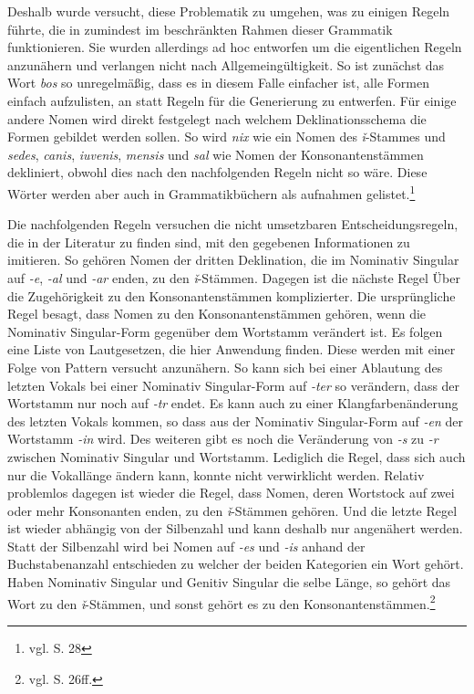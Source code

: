 \documentclass[fontsize=12pt,abstract=on,titlepage,bibliography=totoc,ngerman,listof=totoc]{scrreprt}
\begin{document}
Deshalb wurde versucht, diese Problematik zu umgehen, was zu einigen Regeln führte, die in zumindest im beschränkten Rahmen dieser Grammatik funktionieren. Sie wurden allerdings ad hoc entworfen um die eigentlichen Regeln anzunähern und verlangen nicht nach Allgemeingültigkeit. So ist zunächst das Wort \textit{bos} so unregelmäßig, dass es in diesem Falle einfacher ist, alle Formen einfach aufzulisten, an statt Regeln für die Generierung zu entwerfen. Für einige andere Nomen wird direkt festgelegt nach welchem Deklinationsschema die Formen gebildet werden sollen. So wird \textit{nix} wie ein Nomen des \textit{ǐ}-Stammes und \textit{sedes}, \textit{canis}, \textit{iuvenis}, \textit{mensis} und \textit{sal} wie Nomen der Konsonantenstämmen dekliniert, obwohl dies nach den nachfolgenden Regeln nicht so wäre. Diese Wörter werden aber auch in Grammatikbüchern als aufnahmen gelistet.\footnote{vgl. \cite{BAYER-LINDAUER1994} S. 28} \par
Die nachfolgenden Regeln versuchen die nicht umsetzbaren Entscheidungsregeln, die in der Literatur zu finden sind, mit den gegebenen Informationen zu imitieren. So gehören Nomen der dritten Deklination, die im Nominativ Singular auf \textit{-e}, \textit{-al} und \textit{-ar} enden, zu den \textit{ǐ}-Stämmen. Dagegen ist die nächste Regel Über die Zugehörigkeit zu den Konsonantenstämmen komplizierter. Die ursprüngliche Regel besagt, dass Nomen zu den Konsonantenstämmen gehören, wenn die Nominativ Singular-Form gegenüber dem Wortstamm verändert ist. Es folgen eine Liste von Lautgesetzen, die hier Anwendung finden. Diese werden mit einer Folge von Pattern versucht anzunähern. So kann sich bei einer Ablautung des letzten Vokals bei einer Nominativ Singular-Form auf \textit{-ter} so verändern, dass der Wortstamm nur noch auf \textit{-tr} endet. Es kann auch zu einer Klangfarbenänderung des letzten Vokals kommen, so dass aus der Nominativ Singular-Form auf \textit{-en} der Wortstamm \textit{-in} wird. Des weiteren gibt es noch die Veränderung von \textit{-s} zu \textit{-r} zwischen Nominativ Singular und Wortstamm. Lediglich die Regel, dass sich auch nur die Vokallänge ändern kann, konnte nicht verwirklicht werden. Relativ problemlos dagegen ist wieder die Regel, dass Nomen, deren Wortstock auf zwei oder mehr Konsonanten enden, zu den \textit{ǐ}-Stämmen gehören. Und die letzte Regel ist wieder abhängig von der Silbenzahl und kann deshalb nur angenähert werden. Statt der Silbenzahl wird bei Nomen auf \textit{-es} und \textit{-is} anhand der Buchstabenanzahl entschieden zu welcher der beiden Kategorien ein Wort gehört. Haben Nominativ Singular und Genitiv Singular die selbe Länge, so gehört das Wort zu den \textit{ǐ}-Stämmen, und sonst gehört es zu den Konsonantenstämmen.\footnote{vgl. \cite{BAYER-LINDAUER1994} S. 26ff.} \par
\end{document}
